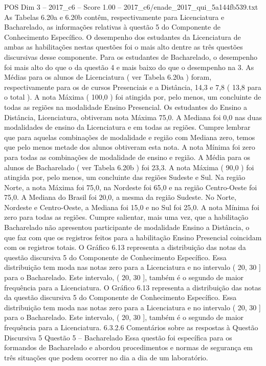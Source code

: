 \begin{textsample}{POS Dim 3 – 2017\_c6 – Score 1.00 – 2017\_c6/enade\_2017\_qui\_5a144fb539.txt}
As Tabelas 6.20a e 6.20b contêm, respectivamente para Licenciatura e Bacharelado, as informações relativas à questão 5 do Componente de Conhecimento Específico.
O desempenho dos estudantes da Licenciatura de ambas as habilitações nestas questões foi o mais alto dentre as três questões discursivas desse componente.
Para os estudantes de Bacharelado, o desempenho foi mais alto do que o da questão 4 e mais baixo do que o desempenho na 3.
As Médias para os alunos de Licenciatura ( ver Tabela 6.20a ) foram, respectivamente para os de cursos Presenciais e a Distância, 14,3 e 7,8 ( 13,8 para o total ).
A nota Máxima ( 100,0 ) foi atingida por, pelo menos, um concluinte de todas as regiões na modalidade Ensino Presencial.
Os estudantes do Ensino a Distância, Licenciatura, obtiveram nota Máxima 75,0.
A Mediana foi 0,0 nas duas modalidades de ensino da Licenciatura e em todas as regiões.
Cumpre lembrar que para aquelas combinações de modalidade e região com Mediana zero, temos que pelo menos metade dos alunos obtiveram esta nota.
A nota Mínima foi zero para todas as combinações de modalidade de ensino e região.
A Média para os alunos de Bacharelado ( ver Tabela 6.20b ) foi 23,3.
A nota Máxima ( 90,0 ) foi atingida por, pelo menos, um concluinte das regiões Sudeste e Sul.
Na região Norte, a nota Máxima foi 75,0, na Nordeste foi 65,0 e na região Centro-Oeste foi 75,0.
A Mediana do Brasil foi 20,0, a mesma da região Sudeste.
No Norte, Nordeste e Centro-Oeste, a Mediana foi 15,0 e no Sul foi 25,0.
A nota Mínima foi zero para todas as regiões.
Cumpre salientar, mais uma vez, que a habilitação Bacharelado não apresentou participante de modalidade Ensino a Distância, o que faz com que os registros feitos para a habilitação Ensino Presencial coincidam com os registros totais.
O Gráfico 6.13 representa a distribuição das notas da questão discursiva 5 do Componente de Conhecimento Específico.
Essa distribuição tem moda nas notas zero para a Licenciatura e no intervalo ( 20, 30 ] para o Bacharelado.
Este intervalo, ( 20, 30 ], também é o segundo de maior frequência para a Licenciatura.
O Gráfico 6.13 representa a distribuição das notas da questão discursiva 5 do Componente de Conhecimento Específico.
Essa distribuição tem moda nas notas zero para a Licenciatura e no intervalo ( 20, 30 ] para o Bacharelado.
Este intervalo, ( 20, 30 ], também é o segundo de maior frequência para a Licenciatura. 6.3.2.6 Comentários sobre as respostas à Questão Discursiva 5 Questão 5 – Bacharelado Essa questão foi específica para os formandos de Bacharelado e abordou procedimentos e normas de segurança em três situações que podem ocorrer no dia a dia de um laboratório.

\end{textsample}
